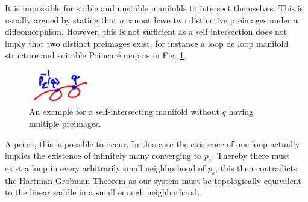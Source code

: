 \begin{remark}[]
	It is impossible for stable and unstable manifolds to intersect themselves. This is usually argued by stating that $q$ cannot have two distinctive preimages under a diffeomorphism. However, this is not sufficient as a self intersection does not imply that two distinct preimages exist, for instance a loop de loop manifold structure and suitable Poincaré map as in Fig. \ref{fig:loopdeloop}.
	\begin{figure}[h!]
		\centering
		\includegraphics[width=0.25\textwidth]{figures/ch6/12loopdeloop.png}
		\caption{An example for a self-intersecting manifold without $q$ having multiple preimages.}
		\label{fig:loopdeloop}
	\end{figure}
A priori, this is possible to occur. In this case the existence of one loop actually implies the existence of infinitely many converging to $p_{\varepsilon}$. Thereby there must exist a loop in every arbitrarily small neighborhood of $p_{\varepsilon}$, this then contradicts the Hartman-Grobman Theorem as our system must be topologically equivalent to the linear saddle in a small enough neighborhood. 	
\end{remark}

